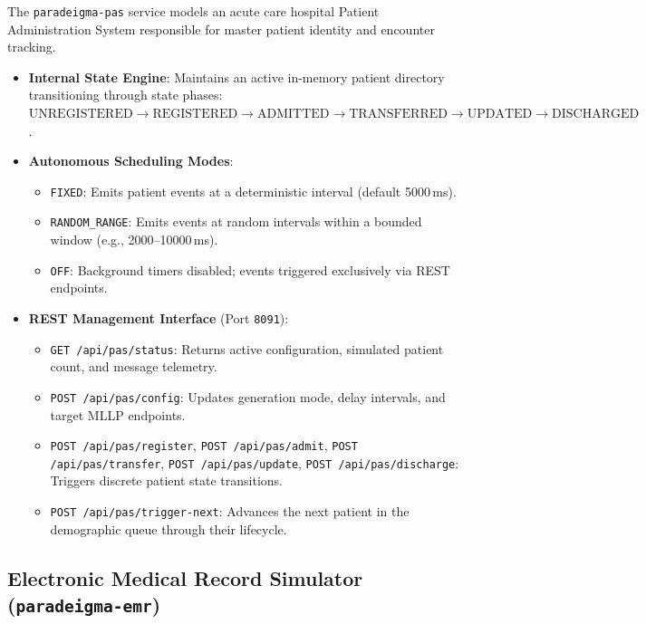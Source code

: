 The \texttt{paradeigma-pas} service models an acute care hospital Patient Administration System responsible for master patient identity and encounter tracking.
\begin{itemize}
    \item \textbf{Internal State Engine}: Maintains an active in-memory patient directory transitioning through state phases: $\text{UNREGISTERED} \to \text{REGISTERED} \to \text{ADMITTED} \to \text{TRANSFERRED} \to \text{UPDATED} \to \text{DISCHARGED}$.
    \item \textbf{Autonomous Scheduling Modes}:
    \begin{itemize}
        \item \texttt{FIXED}: Emits patient events at a deterministic interval (default 5000\,ms).
        \item \texttt{RANDOM\_RANGE}: Emits events at random intervals within a bounded window (e.g., 2000--10000\,ms).
        \item \texttt{OFF}: Background timers disabled; events triggered exclusively via REST endpoints.
    \end{itemize}
    \item \textbf{REST Management Interface} (Port \texttt{8091}):
    \begin{itemize}
        \item \texttt{GET /api/pas/status}: Returns active configuration, simulated patient count, and message telemetry.
        \item \texttt{POST /api/pas/config}: Updates generation mode, delay intervals, and target MLLP endpoints.
        \item \texttt{POST /api/pas/register}, \texttt{POST /api/pas/admit}, \texttt{POST /api/pas/transfer}, \texttt{POST /api/pas/update}, \texttt{POST /api/pas/discharge}: Triggers discrete patient state transitions.
        \item \texttt{POST /api/pas/trigger-next}: Advances the next patient in the demographic queue through their lifecycle.
    \end{itemize}
\end{itemize}

\subsection{Electronic Medical Record Simulator (\texttt{paradeigma-emr})}

